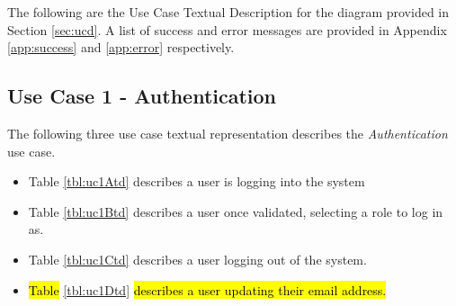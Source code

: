 \documentclass[fontsize=12pt,paper=letter,twoside]{scrartcl}
\begin{document}
The following are the Use Case Textual Description for the diagram provided in Section \ref{sec:ucd}. A list of success and error messages are provided in Appendix \ref{app:success} and \ref{app:error} respectively.
\newpage
\subsection{Use Case 1 - Authentication} \label{subsec:uc1}

The following three use case textual representation describes the \emph{Authentication} use case.


\begin{itemize}
\item Table \ref{tbl:uc1Atd} describes a user is logging into the system
\item Table \ref{tbl:uc1Btd} describes a user once validated, selecting a role to log in as.
\item Table \ref{tbl:uc1Ctd} describes a user logging out of the system.
\item \hl{Table} \ref{tbl:uc1Dtd} \hl{describes a user updating their email address.}
\end{itemize}
\end{document}
